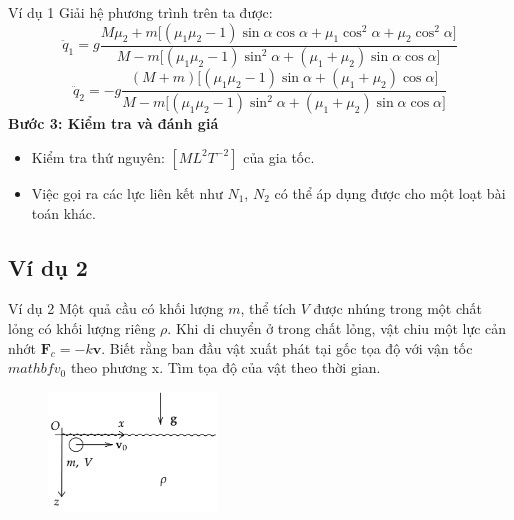 \begin{frame}{Ví dụ 1}
    Giải hệ phương trình trên ta được:
    \begin{equation*}
    \ddot q_1 =g
\frac{
M\mu_2
+m\Big[(\mu_1 \mu_2 -1)\sin\alpha\cos\alpha
+\mu_1\cos^2\alpha
+\mu_2\cos^2\alpha
\Big]
}
{M - m\Big[(\mu_1\mu_2 -1)\sin^2\alpha
+(\mu_1+\mu_2)\sin\alpha\cos\alpha
\Big]}
    \end{equation*}
    \begin{equation*}
        \ddot q_2 =
-g\frac{(M+m)\Big[
(\mu_1\mu_2 -1)\sin\alpha
+(\mu_1 +\mu_2)\cos\alpha
\Big]}
{M - m\Big[(\mu_1\mu_2 -1)\sin^2\alpha
+(\mu_1+\mu_2)\sin\alpha\cos\alpha
\Big]}
    \end{equation*}
\textbf{Bước 3: Kiểm tra và đánh giá}
\begin{itemize}
    \item Kiểm tra thứ nguyên: \([ML^2T^{-2}]\) của gia tốc.
    \item Việc gọi ra các lực liên kết như \(N_1\), \(N_2\) có thể áp dụng được cho một loạt bài toán khác.
\end{itemize}
\end{frame}

\subsection{Ví dụ 2}
\begin{frame}{Ví dụ 2}
    Một quả cầu có khối lượng \(m\), thể tích \(V\) được nhúng trong một chất lỏng có khối lượng riêng \(\rho\). Khi di chuyển ở trong chất lỏng, vật chiu một lực cản nhớt \(\mathbf F_c=-k\mathbf v\). Biết rằng ban đầu vật xuất phát tại gốc tọa độ với vận tốc \(mathbf v_0\) theo phương x. Tìm tọa độ của vật theo thời gian.
\begin{figure}
    \centering
    \includegraphics[width=0.4\textwidth]{Slides/Figure/masatnhot.png}
\end{figure}
\end{frame}

